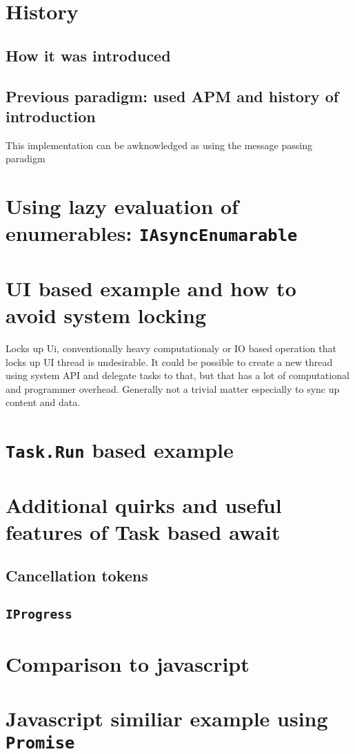 \documentclass{article}
\begin{document}
\section{History}
\subsection{How it was introduced}
\subsection{Previous paradigm: used APM and history of introduction}
This implementation can be awknowledged as using the message passing paradigm

\section{Using lazy evaluation of enumerables: \texttt{IAsyncEnumarable}}

\section{UI based example and how to avoid system locking}
Locks up Ui, conventionally heavy computationaly or IO based operation that locks up UI thread is undesirable.
It could be possible to create a new thread using system API and delegate tasks to that,
but that has a lot of computational and programmer overhead.
Generally not a trivial matter especially to sync up content and data.


\section{\texttt{Task.Run} based example}


\section{Additional quirks and useful features of Task based await}
\subsection{Cancellation tokens}
\subsection{\texttt{IProgress}}


\section{Comparison to javascript}

\section{Javascript similiar example using \texttt{Promise}}




\end{document}
